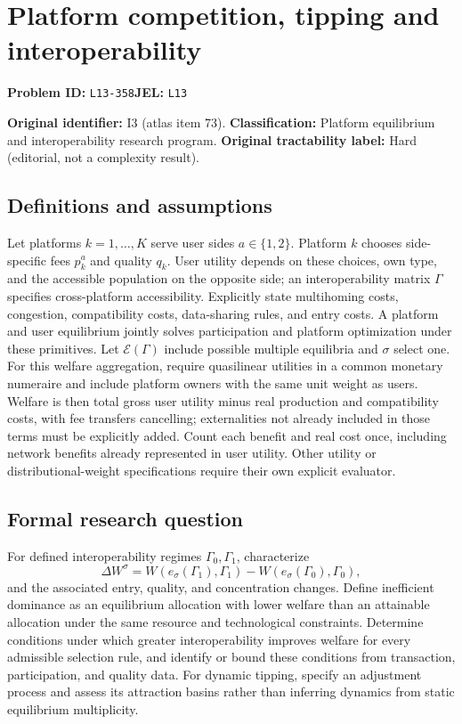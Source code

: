 \documentclass[11pt,a4paper]{article}
\begin{document}
\section*{Platform competition, tipping and interoperability}
\textbf{Problem ID:} \texttt{L13-358}\quad \textbf{JEL:} \texttt{L13}\par
\label{problem:OP-0073}
\label{atlas:prob:I3}

\noindent\textbf{Original identifier:} I3 (atlas item 73). \textbf{Classification:} Platform equilibrium and interoperability research program. \textbf{Original tractability label:} Hard (editorial, not a complexity result).

\subsection*{Definitions and assumptions}

Let platforms $k=1,\ldots,K$ serve user sides $a\in\{1,2\}$. Platform $k$ chooses side-specific fees $p_k^a$ and quality $q_k$. User utility depends on these choices, own type, and the accessible population on the opposite side; an interoperability matrix $\Gamma$ specifies cross-platform accessibility. Explicitly state multihoming costs, congestion, compatibility costs, data-sharing rules, and entry costs. A platform and user equilibrium jointly solves participation and platform optimization under these primitives. Let $\mathcal E(\Gamma)$ include possible multiple equilibria and $\sigma$ select one. For this welfare aggregation, require quasilinear utilities in a common monetary numeraire and include platform owners with the same unit weight as users. Welfare is then total gross user utility minus real production and compatibility costs, with fee transfers cancelling; externalities not already included in those terms must be explicitly added. Count each benefit and real cost once, including network benefits already represented in user utility. Other utility or distributional-weight specifications require their own explicit evaluator.

\subsection*{Formal research question}

For defined interoperability regimes $\Gamma_0,\Gamma_1$, characterize
\[
\Delta W^\sigma=W(e_\sigma(\Gamma_1),\Gamma_1)-W(e_\sigma(\Gamma_0),\Gamma_0),
\]
and the associated entry, quality, and concentration changes. Define inefficient dominance as an equilibrium allocation with lower welfare than an attainable allocation under the same resource and technological constraints. Determine conditions under which greater interoperability improves welfare for every admissible selection rule, and identify or bound these conditions from transaction, participation, and quality data. For dynamic tipping, specify an adjustment process and assess its attraction basins rather than inferring dynamics from static equilibrium multiplicity.
\end{document}
